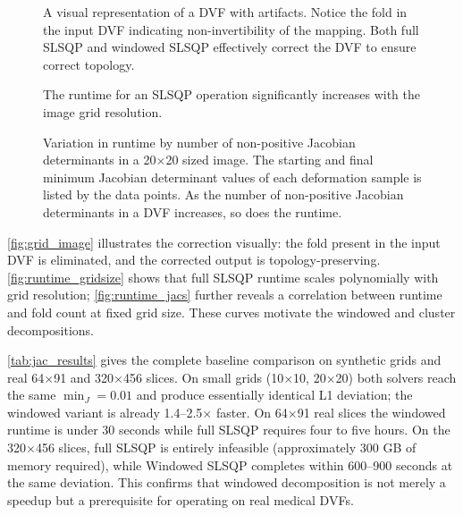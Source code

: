 \begin{figure}
    \centering
    \caption{A visual representation of a DVF with artifacts. Notice the fold in the input DVF indicating non-invertibility of the mapping. Both full SLSQP and windowed SLSQP effectively correct the DVF to ensure correct topology.}
    \label{fig:grid_image}
\end{figure}

\begin{figure}
    \centering
    \caption{The runtime for an SLSQP operation significantly increases with the image grid resolution.}
    \label{fig:runtime_gridsize}
\end{figure}

\begin{figure}
    \centering
    \caption{Variation in runtime by number of non-positive Jacobian determinants in a 20$\times$20 sized image. The starting and final minimum Jacobian determinant values of each deformation sample is listed by the data points. As the number of non-positive Jacobian determinants in a DVF increases, so does the runtime.}
    \label{fig:runtime_jacs}
\end{figure}

\autoref{fig:grid_image} illustrates the correction visually: the fold present in the input DVF is eliminated, and the corrected output is topology-preserving. \autoref{fig:runtime_gridsize} shows that full SLSQP runtime scales polynomially with grid resolution; \autoref{fig:runtime_jacs} further reveals a correlation between runtime and fold count at fixed grid size. These curves motivate the windowed and cluster decompositions.

\autoref{tab:jac_results} gives the complete baseline comparison on synthetic grids and real 64$\times$91 and 320$\times$456 slices. On small grids (10$\times$10, 20$\times$20) both solvers reach the same $\min_J = 0.01$ and produce essentially identical L1 deviation; the windowed variant is already 1.4--2.5$\times$ faster. On 64$\times$91 real slices the windowed runtime is under 30 seconds while full SLSQP requires four to five hours. On the 320$\times$456 slices, full SLSQP is entirely infeasible (approximately 300 GB of memory required), while Windowed SLSQP completes within 600--900 seconds at the same deviation. This confirms that windowed decomposition is not merely a speedup but a prerequisite for operating on real medical DVFs.

